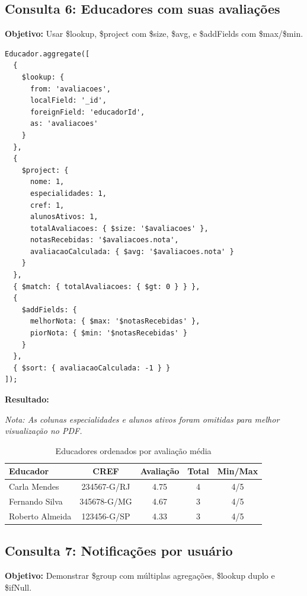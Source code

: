 \documentclass[12pt,a4paper]{article}
\begin{document}
\subsection{Consulta 6: Educadores com suas avaliações}

\textbf{Objetivo:} Usar \$lookup, \$project com \$size, \$avg, e \$addFields com \$max/\$min.

\begin{lstlisting}[caption=Query 6 - Análise de Educadores]
Educador.aggregate([
  {
    $lookup: {
      from: 'avaliacoes',
      localField: '_id',
      foreignField: 'educadorId',
      as: 'avaliacoes'
    }
  },
  {
    $project: {
      nome: 1,
      especialidades: 1,
      cref: 1,
      alunosAtivos: 1,
      totalAvaliacoes: { $size: '$avaliacoes' },
      notasRecebidas: '$avaliacoes.nota',
      avaliacaoCalculada: { $avg: '$avaliacoes.nota' }
    }
  },
  { $match: { totalAvaliacoes: { $gt: 0 } } },
  {
    $addFields: {
      melhorNota: { $max: '$notasRecebidas' },
      piorNota: { $min: '$notasRecebidas' }
    }
  },
  { $sort: { avaliacaoCalculada: -1 } }
]);
\end{lstlisting}

\textbf{Resultado:}

\textit{Nota: As colunas especialidades e alunos ativos foram omitidas para melhor visualização no PDF.}

\begin{table}[h]
\centering
\small
\begin{tabular}{lcccc}
\toprule
Educador & CREF & Avaliação & Total & Min/Max \\
\midrule
Carla Mendes & 234567-G/RJ & 4.75 & 4 & 4/5 \\
Fernando Silva & 345678-G/MG & 4.67 & 3 & 4/5 \\
Roberto Almeida & 123456-G/SP & 4.33 & 3 & 4/5 \\
\bottomrule
\end{tabular}
\caption{Educadores ordenados por avaliação média}
\end{table}

\subsection{Consulta 7: Notificações por usuário}

\textbf{Objetivo:} Demonstrar \$group com múltiplas agregações, \$lookup duplo e \$ifNull.
\end{document}
